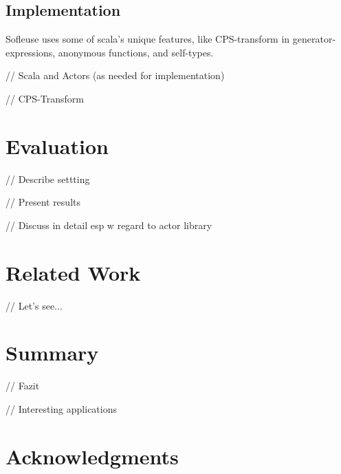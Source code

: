 \documentclass{sig-alternate}
\begin{document}
\subsection{Implementation}
                  
Sofleuse uses some of scala's unique features, like CPS-transform in generator-expressions,
anonymous functions, and self-types. 

// Scala and Actors (as needed for implementation)

// CPS-Transform 


\section{Evaluation}

// Describe settting

// Present results

// Discuss in detail esp w regard to actor library


\section{Related Work}

// Let's see...

\section{Summary}
                  
// Fazit

// Interesting applications

\section{Acknowledgments}


%  
\end{document}
